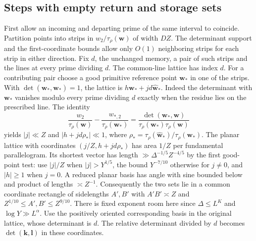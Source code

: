 \documentclass[11pt]{amsart}
\numberwithin{equation}{section}
\theoremstyle{remark}
\begin{document}
\subsection{Steps with empty return and storage sets}

First allow an incoming and departing prime of the same interval
to coincide. Partition points into strips in $w_2/\tau_\rho(\mathbf w)$
of width $DZ$. The determinant support and the first-coordinate
bounds allow only $O(1)$ neighboring strips for each strip in
either direction. Fix $d$, the unchanged memory, a pair of such
strips and the lines at every prime dividing $d$. The common-line
lattice has index $d$. For a contributing pair choose a good
primitive reference point $\mathbf w_*$ in one of the strips.
With $\det(\mathbf w_*,\widehat{\mathbf w}_*)=1$, the lattice is
$h\mathbf w_*+jd\widehat{\mathbf w}_*$. Indeed the determinant with
$\mathbf w_*$ vanishes modulo every prime dividing $d$ exactly when
the residue lies on the prescribed line. The identity
\[
 \frac{w_2}{\tau_\rho(\mathbf w)}-
 \frac{w_{*,2}}{\tau_\rho(\mathbf w_*)}
 =\frac{\det(\mathbf w_*,\mathbf w)}%
         {\tau_\rho(\mathbf w_*)\tau_\rho(\mathbf w)}
\]
yields $|j|\ll Z$ and $|h+jd\rho_*|\ll1$, where
$\rho_*=\tau_\rho(\widehat{\mathbf w}_*)/\tau_\rho(\mathbf w_*)$.
The planar lattice with coordinates $(j/Z,h+jd\rho_*)$ has area
$1/Z$ per fundamental parallelogram. Its shortest vector has
length $\gg\Delta^{-1/5}Z^{-4/5}$ by the first good-point test:
use $|j|/Z$ when $|j|>Y^{1/5}$, the bound $Y^{-7/10}$ otherwise
for $j\ne0$, and $|h|\ge1$ when $j=0$. A reduced planar basis has
angle with sine bounded below and product of lengths $\asymp Z^{-1}$.
Consequently the two sets lie in a common coordinate rectangle of
sidelengths $A',B'$ with $A'B'\asymp Z$ and
$Z^{1/10}\le A',B'\le Z^{9/10}$. There is fixed exponent room here
since $\Delta\le L^K$ and $\log Y\gg L^\alpha$. Use the positively
oriented corresponding basis in the original lattice, whose
determinant is $d$. The relative determinant divided by $d$ becomes
$\det(\mathbf k,\mathbf l)$ in these coordinates.
\end{document}
